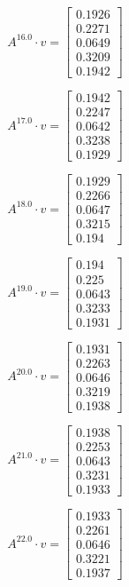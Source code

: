 \documentclass{article}
\begin{document}
  $$A^{16.0} \cdot v = \begin{bmatrix}
  0.1926\\
  0.2271\\
  0.0649\\
  0.3209\\
  0.1942
  \end{bmatrix}
  $$
  
  $$A^{17.0} \cdot v = \begin{bmatrix}
  0.1942\\
  0.2247\\
  0.0642\\
  0.3238\\
  0.1929
  \end{bmatrix}
  $$
  
  $$A^{18.0} \cdot v = \begin{bmatrix}
  0.1929\\
  0.2266\\
  0.0647\\
  0.3215\\
  0.194
  \end{bmatrix}
  $$
  
  $$A^{19.0} \cdot v = \begin{bmatrix}
  0.194\\
  0.225\\
  0.0643\\
  0.3233\\
  0.1931
  \end{bmatrix}
  $$
  
  $$A^{20.0} \cdot v = \begin{bmatrix}
  0.1931\\
  0.2263\\
  0.0646\\
  0.3219\\
  0.1938
  \end{bmatrix}
  $$
  
  $$A^{21.0} \cdot v = \begin{bmatrix}
  0.1938\\
  0.2253\\
  0.0643\\
  0.3231\\
  0.1933
  \end{bmatrix}
  $$
  
  $$A^{22.0} \cdot v = \begin{bmatrix}
  0.1933\\
  0.2261\\
  0.0646\\
  0.3221\\
  0.1937
  \end{bmatrix}
  $$
  
\end{document}
